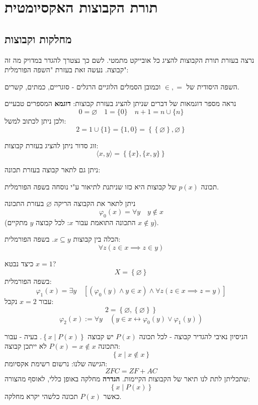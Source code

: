 \documentclass{tstextbook}
\begin{document}
\section{תורת הקבוצות האקסיומטית}

\subsection{מחלקות וקבוצות}

נרצה בעזרת תורת הקבוצות להציג כל אובייקט מתמטי. לשם כך נצטרך להגדר במדויק מה זה קבוצה. נעשה זאת בעזרת "השפה הפורמלית":

\begin{definition}
השפה היסודית של \(\in, =\) וכמובן הסמלים הלוגיים הרגלים - סוגריים, כמתים, קשרים.

\end{definition}
נראה מספר דוגמאות של דברים שניתן להציג בעזרת קבוצות:
\textbf{דוגמא}
המספרים טבעיים
$$0 = \varnothing \quad 1 = \{ 0 \}\quad n+1=n\cup \{ n \}$$
ולכן ניתן לכתוב למשל:
$$2=1 \cup \{ 1 \} = \{ 1,0 \}=\left\{  \left\{  \varnothing   \right\},\varnothing   
\right\}$$

\begin{example}
זוג סדור ניתן להציג בעזרת קבוצות:
$$\langle x,y \rangle =\left\{  \{ x \},\{ x,y \}  \right\}$$

\end{example}
ניתן גם לתאר קבוצה בעזרת תכונה:

\begin{definition}
תכונה \(p(x)\) של קבוצות היא כזו שניתנת לתיאור ע"י נוסחה בשפה הפורמלית.

\end{definition}
\begin{example}
ניתן לתאר את הקבוצה הריקה \(\varnothing\) בעזרת התכונה
$$\varphi_{0}(x)= \forall y\quad y \not \in x$$
(התכונה התואמת עבור \(x\): לכל קבוצה \(y\) מתקיים \(x\not \in y\)).

\end{example}
\begin{example}
הכלה בין קבוצות \(x\subseteq y\). בשפה הפורמלית:
$$\forall z\left( z \in x \implies z \in y \right)$$

\end{example}
\begin{example}
כיצד נבטא \(x=1\)?
$$X=\left\{  \varnothing   \right\}$$
בשפה הפורמלית:
$$\varphi_{1}(x)= \exists y\quad \left[ \left( \varphi_{0}(y)\land y \in x \right) \land  \forall z \left( z \in x\implies z = y \right)\right]$$
עבור \(x=2\) נקבל:
$$2=\left\{  \varnothing ,\left\{  \varnothing   \right\}  \right\}$$$$\varphi_{2}\left(x\right):=\forall y\quad\left(y\in x\leftrightarrow\varphi_{0}\left(y\right)\vee\varphi_{1}\left(y\right)\right)$$

\end{example}
הניסיון נאיבי להגדיר קבוצה - לכל תכונה \(P(x)\) יש קבוצה \(\left\{  x \mid P(x)  \right\}\).
בעיה - עבור התכונה \(P(x)=x \not \in x\) לא ייתכן קבוצה:
$$\left\{  x\mid x \not  \in x  \right\}$$
הגישה שלנו: נרשום רשימת אקסיומת:
$$ZFC = ZF+AC$$
שתכליתן לתת לנו תיאר של הקבוצות הקיימות.
\textbf{הגדרה} מחלקה
באופן כללי, לאוסף מהצורה:
$$\left\{  x\mid P(x)  \right\}$$
כאשר \(P(x)\) תכונה כלשהי יקרא מחלקה.
\end{document}
